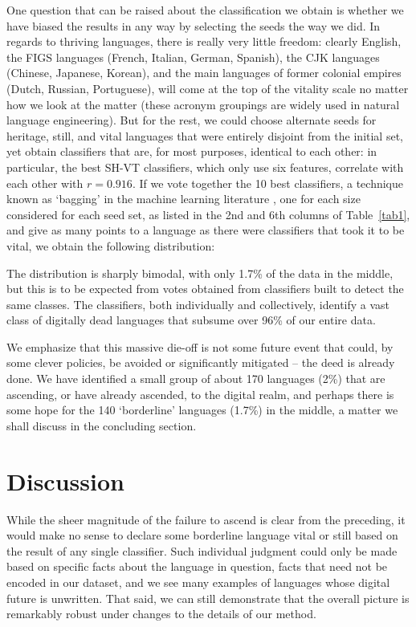 \documentclass[10pt]{article}
\begin{document}
One question that can be raised about the classification we obtain is whether
we have biased the results in any way by selecting the seeds the way we
did. In regards to thriving languages, there is really very little freedom:
clearly English, the FIGS languages (French, Italian, German, Spanish), the
CJK languages (Chinese, Japanese, Korean), and the main languages of former
colonial empires (Dutch, Russian, Portuguese), will come at the top of the
vitality scale no matter how we look at the matter (these acronym groupings
are widely used in natural language engineering). But for the rest, we could
choose alternate seeds for heritage, still, and vital languages that were
entirely disjoint from the initial set, yet obtain classifiers that are, for
most purposes, identical to each other: in particular, the best SH-VT
classifiers, which only use six features, correlate with each other with
$r=0.916$. If we vote together the 10 best classifiers,
{\color{black} a technique known as `bagging' in the machine learning
  literature \cite{Breiman:1996},}  one for each size
considered for each seed set, as listed in the 2nd and 6th columns of Table~\ref{tab1}, 
and give as many points to a language as there were classifiers that took it
to be vital, we obtain the following distribution:


\medskip\noindent The distribution is sharply bimodal, with only 1.7\% of the
data in the middle, but this is to be expected from votes obtained from
classifiers built to detect the same classes. The classifiers, both
individually and collectively, identify a vast class of digitally dead
languages that subsume over 96\% of our entire data. 

We emphasize that this massive die-off is not some future event that could, by
some clever policies, be avoided or significantly mitigated -- the deed is
already done. We have identified a small group of about 170 languages (2\%)
that are ascending, or have already ascended, to the digital realm,
and perhaps there is some hope for the 140 `borderline' languages (1.7\%) in
the middle, a matter we shall discuss in the concluding section. 

\section*{Discussion}

While the sheer magnitude of the failure to ascend is clear from the preceding, it
would make no sense to declare some borderline language vital or {\color{black} still}
based on the result of any single classifier. Such individual judgment could
only be made based on specific facts about the language in question, facts
that need not be encoded in our dataset, and we see many examples of languages
whose digital future is unwritten. That said, we can still demonstrate that
the overall picture is remarkably robust under changes to the details of our
method. 
\end{document}
